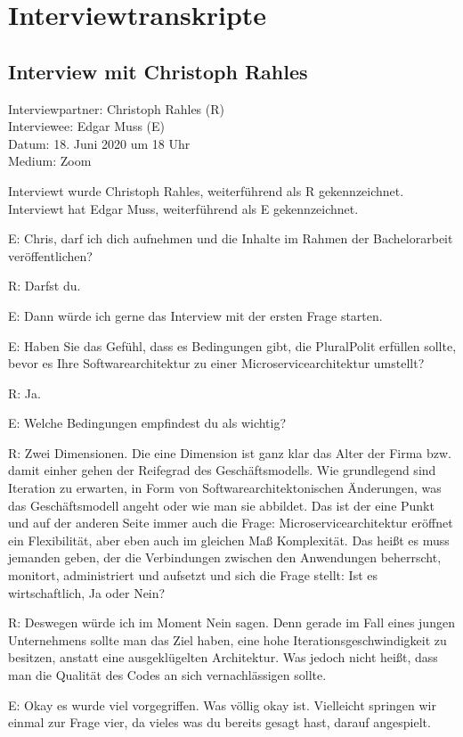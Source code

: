 \section{Interviewtranskripte}

\subsection{Interview mit Christoph Rahles}
Interviewpartner: Christoph Rahles (R) \\
Interviewee: Edgar Muss (E) \\
Datum: 18. Juni 2020 um 18 Uhr \\
Medium: Zoom

Interviewt wurde Christoph Rahles, weiterführend als R gekennzeichnet. Interviewt hat Edgar Muss, weiterführend als E gekennzeichnet.

E: Chris, darf ich dich aufnehmen und die Inhalte im Rahmen der Bachelorarbeit veröffentlichen?

R: Darfst du.

E: Dann würde ich gerne das Interview mit der ersten Frage starten.

E: Haben Sie das Gefühl, dass es Bedingungen gibt, die PluralPolit erfüllen sollte, bevor es Ihre Softwarearchitektur zu einer Microservicearchitektur umstellt?

R: Ja.

E: Welche Bedingungen empfindest du als wichtig?

R: Zwei Dimensionen. Die eine Dimension ist ganz klar das Alter der Firma bzw. damit einher gehen der Reifegrad des Geschäftsmodells. Wie grundlegend sind Iteration zu erwarten, in Form von Softwarearchitektonischen Änderungen, was das Geschäftsmodell angeht oder wie man sie abbildet. Das ist der eine Punkt und auf der anderen Seite immer auch die Frage: Microservicearchitektur eröffnet ein Flexibilität, aber eben auch im gleichen Maß Komplexität. Das heißt es muss  jemanden geben, der die Verbindungen zwischen den Anwendungen beherrscht, monitort, administriert und aufsetzt und sich die Frage stellt: Ist es wirtschaftlich, Ja oder Nein?

R: Deswegen würde ich im Moment Nein sagen. Denn gerade im Fall eines jungen Unternehmens sollte man das Ziel haben, eine hohe Iterationsgeschwindigkeit zu besitzen, anstatt eine ausgeklügelten Architektur. Was jedoch nicht heißt, dass man die Qualität des Codes an sich vernachlässigen sollte.

E: Okay es wurde viel vorgegriffen. Was völlig okay ist. Vielleicht springen wir einmal zur Frage vier, da vieles was du bereits gesagt hast, darauf angespielt.

